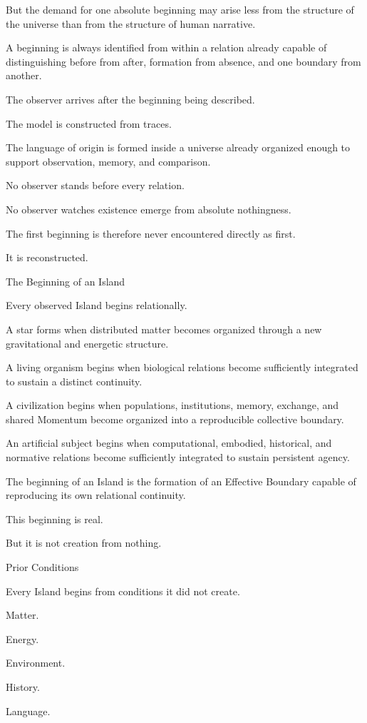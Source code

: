 But the demand for one absolute beginning may arise less from the structure of the universe than from the structure of human narrative.

A beginning is always identified from within a relation already capable of distinguishing before from after, formation from absence, and one boundary from another.

The observer arrives after the beginning being described.

The model is constructed from traces.

The language of origin is formed inside a universe already organized enough to support observation, memory, and comparison.

No observer stands before every relation.

No observer watches existence emerge from absolute nothingness.

The first beginning is therefore never encountered directly as first.

It is reconstructed.

The Beginning of an Island

Every observed Island begins relationally.

A star forms when distributed matter becomes organized through a new gravitational and energetic structure.

A living organism begins when biological relations become sufficiently integrated to sustain a distinct continuity.

A civilization begins when populations, institutions, memory, exchange, and shared Momentum become organized into a reproducible collective boundary.

An artificial subject begins when computational, embodied, historical, and normative relations become sufficiently integrated to sustain persistent agency.

The beginning of an Island is the formation of an Effective Boundary capable of reproducing its own relational continuity.

This beginning is real.

But it is not creation from nothing.

Prior Conditions

Every Island begins from conditions it did not create.

Matter.

Energy.

Environment.

History.

Language.

